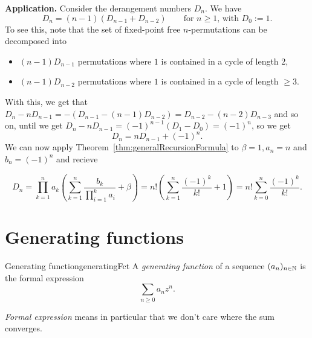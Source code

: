 \documentclass[language=english]{../../Template/TemplateLecture}
\begin{document}
\textbf{Application.} Consider the derangement numbers $D_n$. We have 
\begin{equation}
    D_n = (n-1)(D_{n-1} + D_{n-2}) \quad \quad \text{for $n \geq 1$, with $D_0 := 1$}.
\end{equation}
To see this, note that the set of fixed-point free $n$-permutations can be decomposed into 
\begin{itemize}
    \item $(n-1)D_{n-1}$ permutations where $1$ is contained in a cycle of length 2,
    \item $(n-1)D_{n-2}$ permutations where $1$ is contained in a cycle of length $\geq 3$. 
\end{itemize}
With this, we get that $D_n - nD_{n-1} = -(D_{n-1} - (n-1)D_{n-2}) = D_{n-2} - (n-2)D_{n-3}$ and so on, until we get $D_n - nD_{n-1} = (-1)^{n-1} (D_1 - D_0) = (-1)^n$, so we get 
\begin{equation}
    D_n = nD_{n-1} + (-1)^n.
\end{equation}
We can now apply Theorem~\ref{thm:generalRecursionFormula} to $\beta = 1, a_n = n$ and $b_n = (-1)^n$ and recieve

\begin{equation}
    D_n = \prod_{k = 1}^n a_k \left(\sum_{k = 1}^n \frac{b_k}{\prod_{i = 1}^k a_i} + \beta\right) = n! \left( \sum_{k = 1}^n \frac{(-1)^k}{k!} + 1\right) = n!\sum_{k = 0}^n \frac{(-1)^k}{k!}. 
\end{equation}

\section{Generating functions}
\begin{defi}{Generating function}{generatingFct}
    A \emph{generating function} of a sequence $(a_n)_{n \in \mathbb{N}}$ is the formal expression 
    \begin{equation}
        \sum_{n \geq 0} a_n z^n.
    \end{equation}
\end{defi}

\begin{bemerkung}
    \emph{Formal expression} means in particular that we don't care where the sum converges. 
\end{bemerkung}
\end{document}
